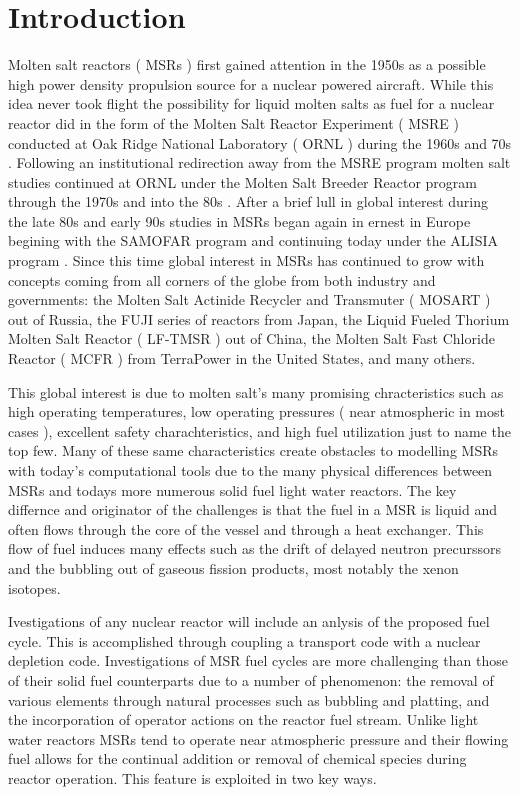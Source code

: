 \chapter{Introduction}

Molten salt reactors ( MSRs ) first gained attention in the 1950s as a possible
high power density propulsion source for a nuclear powered aircraft. While this
idea never took flight the possibility for liquid molten salts as fuel for a
nuclear reactor did in the form of the Molten Salt Reactor Experiment ( MSRE )
conducted at Oak Ridge National Laboratory ( ORNL ) during the 1960s and 70s 
\cite{ORNL-MSRE}. Following an institutional redirection away from the MSRE
program molten salt studies continued at ORNL under the Molten Salt Breeder
Reactor program through the 1970s and into the 80s \cite{ORNL-MSBR}. After a
brief lull in global interest during the late 80s and early 90s studies in MSRs
began again in ernest in Europe begining with the SAMOFAR program and continuing
today under the ALISIA program \cite{SAMOFAR}. Since this time global interest
in MSRs has continued to grow with concepts coming from all corners of the
globe from both industry and governments: the Molten Salt Actinide Recycler and
Transmuter ( MOSART ) out of Russia, the FUJI series of reactors from Japan, 
the Liquid Fueled Thorium Molten Salt Reactor ( LF-TMSR ) out of China, the
Molten Salt Fast Chloride Reactor ( MCFR ) from TerraPower in the United States,
and many others.

This global interest is due to molten salt's many promising chracteristics such
as high operating temperatures, low operating pressures ( near atmospheric in
most cases ), excellent safety charachteristics, and high fuel utilization just
to name the top few. Many of these same characteristics create obstacles to 
modelling MSRs with today's computational tools due to the many physical
differences between MSRs and todays more numerous solid fuel light water
reactors. The key differnce and originator of the challenges is that the fuel
in a MSR is liquid and often flows through the core of the vessel and through
a heat exchanger. This flow of fuel induces many effects such as the drift of
delayed neutron precurssors and the bubbling out of gaseous fission products,
most notably the xenon isotopes.

Ivestigations of any nuclear reactor will include an anlysis of the proposed
fuel cycle. This is accomplished through coupling a transport code with a
nuclear depletion code. Investigations of MSR fuel cycles are more challenging
than those of their solid fuel counterparts due to a number of phenomenon: the
removal of various elements through natural processes such as bubbling and
platting, and the incorporation of operator actions on the reactor fuel stream.
Unlike light water reactors MSRs tend to operate near atmospheric pressure and
their flowing fuel allows for the continual addition or removal of chemical
species during reactor operation. This feature is exploited in two key ways.


